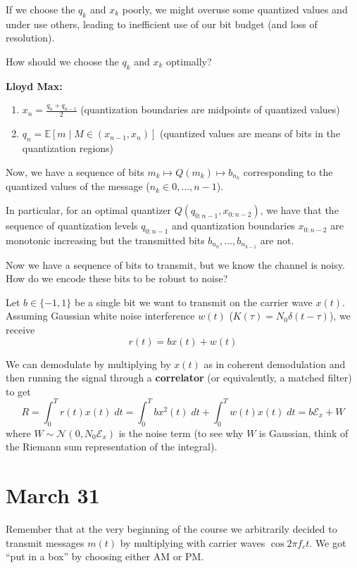 \documentclass[12pt]{report}
\newcommand{\E}{\mathbb{E}}
\newcommand{\Ec}{\mathcal{E}}
\newcommand{\Nc}{\mathcal{N}}
\newcommand*{\tbf}[1]{\ifmmode\mathbf{#1}\else\textbf{#1}\fi}
\begin{document}
If we choose the $q_k$ and $x_k$ poorly, we might overuse some quantized values and under use others, leading to inefficient use of our bit budget (and loss of resolution). 

How should we choose the $q_k$ and $x_k$ optimally? 

\tbf{Lloyd Max:} 
\begin{enumerate}
    \item $x_n = \frac{q_n + q_{n - 1}}{2}$ (quantization boundaries are midpoints of quantized values)
    \item $q_n = \E[m \; | \; M \in (x_{n - 1}, x_n)]$ (quantized values are means of bits in the quantization regions)
\end{enumerate}

Now, we have a sequence of bits $m_k \mapsto Q(m_k) \mapsto b_{n_k}$ corresponding to the quantized values of the message ($n_k \in 0, \dots, n-1$).

In particular, for an optimal quantizer $Q(q_{0:n-1}, x_{0:n-2})$, we have that the sequence of quantization levels $q_{0:n-1}$ and quantization boundaries $x_{0:n-2}$ are monotonic increasing but the transmitted bits $b_{n_0}, \dots, b_{n_{k-1}}$ are not. 

Now we have a sequence of bits to transmit, but we know the channel is noisy. How do we encode these bits to be robust to noise?

Let $b\in \{-1, 1\}$ be a single bit we want to transmit on the carrier wave $x(t)$. Assuming Gaussian white noise interference $w(t)$ ($K(\tau) = N_0 \delta(t - \tau)$), we receive 
\[r(t) = bx(t) + w(t)\]

We can demodulate by multiplying by $x(t)$ as in coherent demodulation and then running the signal through a \tbf{correlator} (or equivalently, a matched filter) to get
\[R = \int_0^T r(t) x(t) \; dt = \int_0^T bx^2(t)\; dt + \int_0^T w(t) x(t)\; dt = b \Ec_x + W\]
where $W \sim \Nc(0, N_0 \Ec_x)$ is the noise term (to see why $W$ is Gaussian, think of the Riemann sum representation of the integral).

\section{March 31} 

Remember that at the very beginning of the course we arbitrarily decided to transmit messages $m(t)$ by multiplying with carrier waves $\cos 2\pi f_c t$. We got ``put in a box'' by choosing either AM or PM. 
\end{document}
